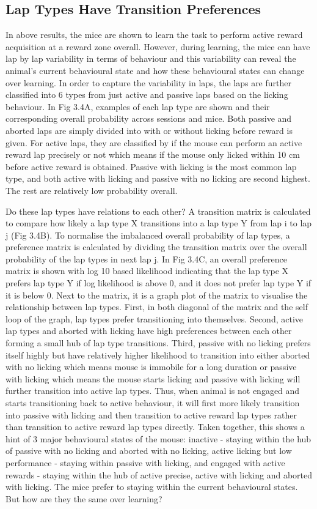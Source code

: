 \subsection{Lap Types Have Transition Preferences}
In above results, the mice are shown to learn the task to perform active reward acquisition at a reward zone overall. However, during learning, the mice can have lap by lap variability in terms of behaviour and this variability can reveal the animal's current behavioural state and how these behavioural states can change over learning. In order to capture the variability in laps, the laps are further classified into 6 types from just active and passive laps based on the licking behaviour. In Fig 3.4A, examples of each lap type are shown and their corresponding overall probability across sessions and mice. Both passive and aborted laps are simply divided into with or without licking before reward is given. For active laps, they are classified by if the mouse can perform an active reward lap precisely or not which means if the mouse only licked within 10 cm before active reward is obtained. Passive with licking is the most common lap type, and both active with licking and passive with no licking are second highest. The rest are relatively low probability overall. 

Do these lap types have relations to each other? A transition matrix is calculated to compare how likely a lap type X transitions into a lap type Y from lap i to lap j (Fig 3.4B). To normalise the imbalanced overall probability of lap types, a preference matrix is calculated by dividing the transition matrix over the overall probability of the lap types in next lap j. In Fig 3.4C, an overall preference matrix is shown with log 10 based likelihood indicating that the lap type X prefers lap type Y if log likelihood is above 0, and it does not prefer lap type Y if it is below 0. Next to the matrix, it is a graph plot of the matrix to visualise the relationship between lap types. First, in both diagonal of the matrix and the self loop of the graph, lap types prefer transitioning into themselves. Second, active lap types and aborted with licking have high preferences between each other forming a small hub of lap type transitions. Third, passive with no licking prefers itself highly but have relatively higher likelihood to transition into either aborted with no licking which means mouse is immobile for a long duration or passive with licking which means the mouse starts licking and passive with licking will further transition into active lap types. Thus, when animal is not engaged and starts transitioning back to active behaviour, it will first more likely transition into passive with licking and then transition to active reward lap types rather than transition to active reward lap types directly. Taken together, this shows a hint of 3 major behavioural states of the mouse: inactive - staying within the hub of passive with no licking and aborted with no licking, active licking but low performance - staying within passive with licking, and engaged with active rewards - staying within the hub of  active precise, active with licking and aborted with licking. The mice prefer to staying within the current behavioural states. But how are they the same over learning?

